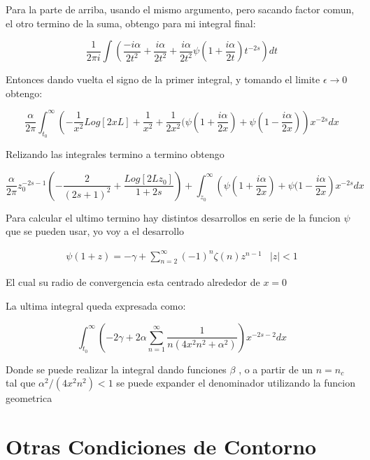 Para la parte de arriba, usando el mismo argumento, pero sacando factor comun, el otro termino de la suma, obtengo para mi integral final:

\begin{equation}
\frac{1}{2 \pi i} \int 
\left(
\frac{- i \alpha}{2 t^2} + 
\frac{i \alpha}{2 t^2} +
\frac{i \alpha}{2 t^2} \psi (1+\frac{i \alpha}{2 t}) 
t ^{-2s} 
\right)
dt
\end{equation}

Entonces dando vuelta el signo de la primer integral, y tomando el limite $\epsilon \rightarrow 0$ obtengo:

\begin{equation}
\frac{\alpha}{2 \pi } \int _{t_0} ^{\infty}
\left(
- \frac{1}{x ^2} Log[2 x L ] +
\frac{1}{ x^2} +
\frac{1}{ 2 x^2} ( \psi (1+ \frac{i \alpha}{2 x}) + \psi (1 - \frac{i \alpha}{2 x})
\right)
x ^{-2s}
dx
\end{equation}

Relizando las integrales termino a termino obtengo

\begin{equation}
\frac{\alpha}{2 \pi} z _{0} ^{-2s-1}
\left(
- \frac{2}{(2s+1) ^2} +
\frac{Log[2 L z _0]}{1+2s}
\right) +
\int _{z_0} ^{\infty} 
\left(
\psi(1 + \frac{i \alpha}{2 x}) +
\psi(1 - \frac{i \alpha}{2 x}
\right)
x ^{-2s}
dx
\end{equation}


Para calcular el ultimo termino hay distintos desarrollos en serie de la funcion $\psi $ que se pueden usar, yo voy a el desarrollo 

\begin{equation}
\begin{array}{cc}
\psi (1+ z ) = - \gamma + \sum _{n=2} ^{\infty} (-1) ^n \zeta (n) z ^{n-1} & |z| < 1
\end{array}
\end{equation}

El cual su radio de convergencia esta centrado alrededor de $x = 0$

La ultima integral queda expresada como:

\begin{equation}
\int _{t_0} ^{\infty} 
\left(
-2 \gamma + 2 \alpha \sum _{n=1} ^{\infty} \frac{1}{n(4 x^2 n^2+\alpha ^2)}
\right)
x ^{-2s-2} dx
\end{equation}

Donde se puede realizar la integral dando funciones $\beta$ , o a partir de un $n = n_c$ tal que $\alpha ^2 /(4 x^2 n^2) < 1$ se puede expander el denominador utilizando la funcion geometrica

\section{Otras Condiciones de Contorno}





